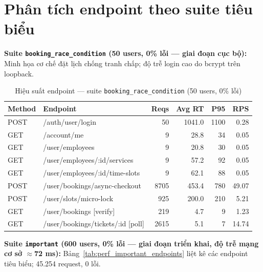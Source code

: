 \section{Phân tích endpoint theo suite tiêu biểu}

\noindent\textbf{Suite \texttt{booking\_race\_condition} (50 users, 0\% lỗi --- giai đoạn cục bộ):} Minh họa cơ chế đặt lịch chống tranh chấp; độ trễ login cao do bcrypt trên loopback.

\begin{table}[H]
\centering
\footnotesize
\begin{tabularx}{\textwidth}{|l|X|r|r|r|r|}
\hline
\textbf{Method} & \textbf{Endpoint} & \textbf{Reqs} & \textbf{Avg RT} & \textbf{P95} & \textbf{RPS} \\
\hline
POST & /auth/user/login & 50 & 1041.0 & 1100 & 0.28 \\
\hline
GET & /account/me & 9 & 28.8 & 34 & 0.05 \\
\hline
GET & /user/employees & 9 & 20.8 & 30 & 0.05 \\
\hline
GET & /user/employees/:id/services & 9 & 57.2 & 92 & 0.05 \\
\hline
GET & /user/employees/:id/time-slots & 9 & 62.1 & 88 & 0.05 \\
\hline
POST & /user/bookings/async-checkout & 8705 & 453.4 & 780 & 49.07 \\
\hline
POST & /user/slots/micro-lock & 925 & 200.0 & 210 & 5.21 \\
\hline
GET & /user/bookings [verify] & 219 & 4.7 & 9 & 1.23 \\
\hline
GET & /user/bookings/tickets/:id [poll] & 2615 & 5.1 & 7 & 14.74 \\
\hline
\end{tabularx}
\caption{Hiệu suất endpoint --- suite \texttt{booking\_race\_condition} (50 users, 0\% lỗi)}
\label{tab:perf_booking_endpoints}
\end{table}

\noindent\textbf{Suite \texttt{important} (600 users, 0\% lỗi --- giai đoạn triển khai, độ trễ mạng cơ sở $\approx$72 ms):} Bảng~\ref{tab:perf_important_endpoints} liệt kê các endpoint tiêu biểu; 45.254 request, 0 lỗi.

